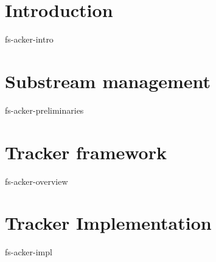 \documentclass[sigconf]{acmart}
\newcommand {\tracker} {trAcker}
\begin{document}
\begin{abstract}
Stream Processing Engines (SPEs) handle potentially infinite sequences of data elements. These sequences are often split into finite chunks of messages (epochs, windows, etc.), and it is mandatory to know the boundaries of these chunks: stateful streaming operators should clear outdated state; time window operators should release output after all elements within the specified time range have arrived. Most state-of-the-art SPEs use substream management, implemented with punctuations, to address this problem. The punctuation approach is powerful but has limitations: it does not support cyclic dataflows, is poorly scalable in some cases due to intensive use of broadcasts, and becomes inefficient when the number of chunks or cluster size becomes significant. We introduce a new substream tracking technique called \tracker\ that may be used when limits of punctuations become relevant. In the experimental section, we study properties of \tracker\ in both synthetic and real-world environments. Experiments show that our technique is scalable, efficiently handles real-world cyclic dataflows, and outperforms punctuations for a large number of substreams.
\end{abstract}

\maketitle


\thispagestyle{empty}

\section {Introduction}
 {fs-acker-intro}

\section{Substream management}
 {fs-acker-preliminaries}

\section{Tracker framework}
 {fs-acker-overview}

\section{Tracker Implementation}
 {fs-acker-impl}
\end{document}

